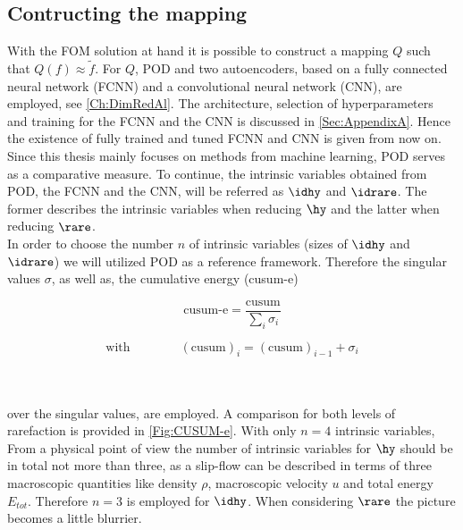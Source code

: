 \subsection{Contructing the mapping}
With the FOM solution at hand it is possible to construct a mapping \(Q\) such that \(Q(f)\approx \tilde{f}\). For \(Q\), POD and two autoencoders, based on a fully connected neural network (FCNN) and a convolutional neural network (CNN), are employed, see \cref{Ch:DimRedAl}. The architecture, selection of hyperparameters and training for the FCNN and the CNN is discussed in \cref{Sec:AppendixA}. Hence the existence of fully trained and tuned FCNN and CNN is given from now on. Since this thesis mainly focuses on methods from machine learning, POD serves as a comparative measure. To continue, the intrinsic variables obtained from POD, the FCNN and the CNN, will be referred as \(\idhy\) and \(\idrare\). The former describes the intrinsic variables when reducing \(\hy\) and the latter when reducing \(\rare\).\\
In order to choose the number \(n\) of intrinsic variables (sizes of \(\idhy\) and \(\idrare\)) we will utilized POD as a reference framework. Therefore the singular values \(\sigma\), as well as, the cumulative energy (cusum-e)\\
\noindent \begin{minipage}{.3\linewidth}
	\begin{equation}
	\textrm{cusum-e} = \frac{\textrm{cusum}}{\sum_i \sigma_i}
	\end{equation}
\end{minipage}%
\begin{minipage}{.7\linewidth}
	\begin{equation}
			\textrm{with} \qquad\qquad(\textrm{cusum})_i =(\text{cusum})_{i-1} + \sigma_{i}
	\end{equation}
\end{minipage}\\\\
over the singular values, are employed. A comparison for both levels of rarefaction is provided in \cref{Fig:CUSUM-e}. With only \(n=4\) intrinsic variables, \\
From a physical point of view the number of intrinsic variables for \(\hy\) should be in total not more than three, as a slip-flow can be described in terms of three macroscopic quantities like density \(\rho\), macroscopic velocity \(u\) and total energy \(E_{tot}\)\cite{BGK}\cite{Bernard}. Therefore \(n=3\) is employed for \(\idhy\). When considering \(\rare\) the picture becomes a little blurrier.  \\

